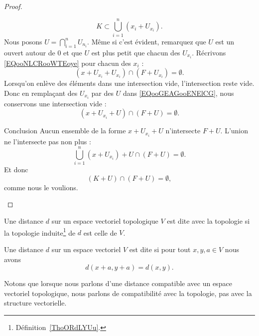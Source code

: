 \begin{proof}
\begin{subproof}
        \begin{equation}
            K\subset\bigcup_{i=1}^n(x_i+U_{x_i}).
        \end{equation}
        Nous posons \( U=\bigcap_{i=1}^nU_{n_i}\). Même si c'est évident, remarquez que \( U\) est un ouvert autour de \( 0\) et que \( U\) est plus petit que chacun des \( U_{x_i}\). Récrivons \eqref{EQooNLCRooWTEoye} pour chacun des \( x_i\) :
        \begin{equation}        \label{EQooGEAGooENElCG}
            (x+U_{x_i}+U_{x_i})\cap (F+U_{x_i})=\emptyset.
        \end{equation}
        Lorsqu'on enlève des éléments dans une intersection vide, l'intersection reste vide. Donc en remplaçant des \( U_{x_i}\) par des \( U\) dans \eqref{EQooGEAGooENElCG}, nous conservons une intersection vide :
        \begin{equation}
            (x+U_{x_i}+U)\cap (F+U)=\emptyset.
        \end{equation}
    \item[Conclusion]
        Aucun ensemble de la forme \( x+U_{x_i}+U\) n'intersecte \( F+U\). L'union ne l'intersecte pas non plus :
        \begin{equation}
            \bigcup_{i=1}^n(x+U_{x_i})+U\cap(F+U)=\emptyset.
        \end{equation}
        Et donc
        \begin{equation}
            (K+U)\cap(F+U)=\emptyset,
        \end{equation}
        comme nous le voulions.
    \end{subproof}
\end{proof}

\begin{definition}      \label{DEFooGTOZooRcvGHg}
    Une distance \( d\) sur un espace vectoriel topologique \( V\) est dite  avec la topologie si la topologie induite\footnote{Définition~\ref{ThoORdLYUu}.} de \( d\) est celle de \( V\).
\end{definition}

\begin{definition}      \label{DEFooEUXVooEBYhNU}
    Une distance \( d\) sur un espace vectoriel \( V\) est dite  si pour tout \( x,y,a\in V\) nous avons
    \begin{equation}
        d(x+a,y+a)=d(x,y).
    \end{equation}
\end{definition}
Notons que lorsque nous parlons d'une distance compatible avec un espace vectoriel topologique, nous parlons de compatibilité avec la topologie, pas avec la structure vectorielle.

